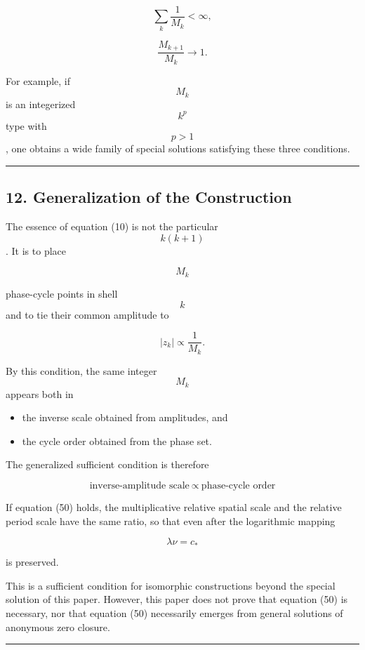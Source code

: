 \documentclass[
  a4paper,
]{article}
\providecommand{\tightlist}{%
  \setlength{\itemsep}{0pt}\setlength{\parskip}{0pt}}
\begin{document}
\[
\sum_k\frac{1}{M_k}<\infty,
\]

\[
\frac{M_{k+1}}{M_k}\to1.
\tag{48}
\]

For example, if \[M_k\] is an integerized \[k^p\] type with \[p>1\], one
obtains a wide family of special solutions satisfying these three
conditions.

\begin{center}\rule{0.5\linewidth}{0.5pt}\end{center}

\subsection{12. Generalization of the
Construction}\label{generalization-of-the-construction}

The essence of equation (10) is not the particular \[k(k+1)\]. It is to
place

\[
M_k
\]

phase-cycle points in shell \[k\] and to tie their common amplitude to

\[
|z_k|
\propto
\frac{1}{M_k}.
\tag{49}
\]

By this condition, the same integer \[M_k\] appears both in

\begin{itemize}
\tightlist
\item
  the inverse scale obtained from amplitudes, and
\item
  the cycle order obtained from the phase set.
\end{itemize}

The generalized sufficient condition is therefore

\[
\boxed{
\text{inverse-amplitude scale}
\ \propto\
\text{phase-cycle order}
}
\tag{50}
\]

If equation (50) holds, the multiplicative relative spatial scale and
the relative period scale have the same ratio, so that even after the
logarithmic mapping

\[
\lambda\nu=c_*
\]

is preserved.

This is a sufficient condition for isomorphic constructions beyond the
special solution of this paper. However, this paper does not prove that
equation (50) is necessary, nor that equation (50) necessarily emerges
from general solutions of anonymous zero closure.

\begin{center}\rule{0.5\linewidth}{0.5pt}\end{center}
\end{document}
